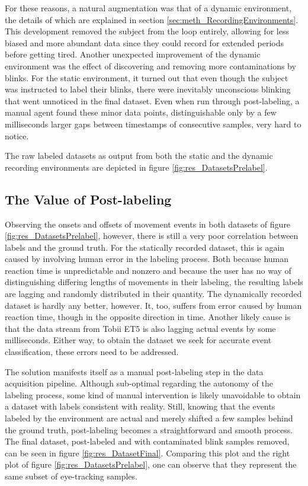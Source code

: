 For these reasons, a natural augmentation was that of a dynamic environment, the details of which are explained in section \ref{sec:meth_RecordingEnvironments}. This development removed the subject from the loop entirely, allowing for less biased and more abundant data since they could record for extended periods before getting tired. Another unexpected improvement of the dynamic environment was the effect of discovering and removing more contaminations by blinks. For the static environment, it turned out that even though the subject was instructed to label their blinks, there were inevitably unconscious blinking that went unnoticed in the final dataset. Even when run through post-labeling, a manual agent found these minor data points, distinguishable only by a few milliseconds larger gaps between timestamps of consecutive samples, very hard to notice. 

The raw labeled datasets as output from both the static and the dynamic recording environments are depicted in figure \ref{fig:res_DatasetsPrelabel}.

\subsection{The Value of Post-labeling}

Observing the onsets and offsets of movement events in both datasets of figure \ref{fig:res_DatasetsPrelabel}, however, there is still a very poor correlation between labels and the ground truth. For the statically recorded dataset, this is again caused by involving human error in the labeling process. Both because human reaction time is unpredictable and nonzero and because the user has no way of distinguishing differing lengths of movements in their labeling, the resulting labels are lagging and randomly distributed in their quantity. The dynamically recorded dataset is hardly any better, however. It, too, suffers from error caused by human reaction time, though in the opposite direction in time. Another likely cause is that the data stream from Tobii ET5 is also lagging actual events by some milliseconds. Either way, to obtain the dataset we seek for accurate event classification, these errors need to be addressed.

The solution manifests itself as a manual post-labeling step in the data acquisition pipeline. Although sub-optimal regarding the autonomy of the labeling process, some kind of manual intervention is likely unavoidable to obtain a dataset with labels consistent with reality. Still, knowing that the events labeled by the environment are actual and merely shifted a few samples behind the ground truth, post-labeling becomes a straightforward and smooth process. The final dataset, post-labeled and with contaminated blink samples removed, can be seen in figure \ref{fig:res_DatasetFinal}. Comparing this plot and the right plot of figure \ref{fig:res_DatasetsPrelabel}, one can observe that they represent the same subset of eye-tracking samples. 


